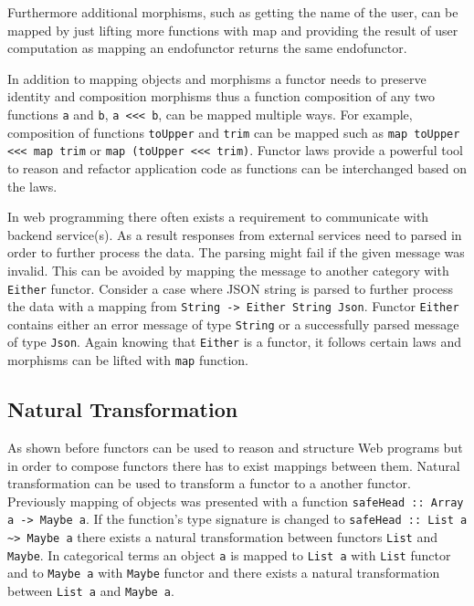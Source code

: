 \documentclass[article]{aaltoseries}
\begin{document}
    Furthermore additional morphisms, such as getting the name of the user, can
    be mapped by just lifting more functions with map and providing the result
    of user computation as mapping an endofunctor returns the same endofunctor.
 
    In addition to mapping objects and morphisms a functor needs to preserve
    identity and composition morphisms thus a function composition of any two
    functions \lstinline|a| and \lstinline|b|, \lstinline|a <<< b|, can be
    mapped multiple ways. For example, composition of functions
    \lstinline|toUpper| and \lstinline|trim| can be mapped such as
    \lstinline|map toUpper <<< map trim| or \lstinline|map (toUpper <<< trim)|.
    Functor laws provide a powerful tool to reason and refactor application code
    as functions can be interchanged based on the laws.

    In web programming there often exists a requirement to communicate with
    backend service(s). As a result responses from external services need to
    parsed in order to further process the data. The parsing might fail if the
    given message was invalid. This can be avoided by mapping the message to
    another category with \lstinline|Either| functor. Consider a case where JSON
    string is parsed to further process the data with a mapping from
    \lstinline|String -> Either String Json|. Functor \lstinline|Either|
    contains either an error message of type \lstinline|String| or a
    successfully parsed message of type \lstinline|Json|. Again knowing that
    \lstinline|Either| is a functor, it follows certain laws and morphisms can
    be lifted with \lstinline|map| function.



  \subsection{Natural Transformation}
    As shown before functors can be used to reason and structure Web programs
    but in order to compose functors there has to exist mappings between them.
    Natural transformation can be used to transform a functor to a another
    functor. Previously mapping of objects was presented with a function
    \lstinline|safeHead :: Array a -> Maybe a|. If the function’s type signature
    is changed to \lstinline|safeHead :: List a ~> Maybe a| there exists a
    natural transformation between functors \lstinline|List| and
    \lstinline|Maybe|. In categorical terms an object \lstinline|a| is mapped to
    \lstinline|List a| with \lstinline|List| functor and to \lstinline|Maybe a| with
    \lstinline|Maybe| functor and there exists a natural transformation between
    \lstinline|List a| and \lstinline|Maybe a|.
\end{document}
